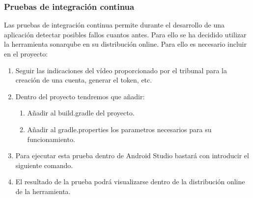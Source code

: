 \subsubsection{Pruebas de integración continua}

Las pruebas de integración continua permite durante el desarrollo de una aplicación detectar posibles fallos cuantos antes. Para ello se ha decidido utilizar la herramienta sonarqube en su distribución online.
Para ello es necesario incluir en el proyecto:

\begin{enumerate}
	\item Seguir las indicaciones del vídeo proporcionado por el tribunal para la creación de una cuenta, generar el token, etc.
	\item Dentro del proyecto tendremos que añadir:
		\begin{enumerate}
			\item Añadir al build.gradle del proyecto. 
			\item Añadir al gradle.properties los parametros necesarios para su funcionamiento.
		\end{enumerate}
	\item Para ejecutar esta prueba dentro de Android Studio bastará con introducir el siguiente comando. 
	
	\item El resultado de la prueba podrá visualizarse dentro de la distribución online de la herramienta.
\end{enumerate}




